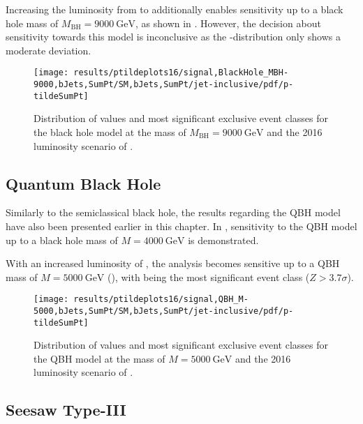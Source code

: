 Increasing the luminosity from \lumiA to \lumiB additionally enables sensitivity up to a black hole mass of $M_\text{BH} = \SI{9000}{\GeV}$, as shown in . However, the decision about sensitivity towards this model is inconclusive as the \ptilde-distribution only shows a moderate deviation. 
\begin{figure}
    \centering
    \texttt{[image: results/ptildeplots16/signal,BlackHole\_MBH-9000,bJets,SumPt/SM,bJets,SumPt/jet-inclusive/pdf/p-tildeSumPt]}
    {
        
    }
    \caption{Distribution of \ptilde values and most significant exclusive event classes for the black hole model at the mass of $M_\text{BH} = \SI{9000}{\GeV}$ and the 2016 luminosity scenario of \lumiB.}
    \label{fig:result_bh_9000}
\end{figure}

\subsection{Quantum Black Hole}
\label{sec:results_qbh}

Similarly to the semiclassical black hole, the results regarding the \ac{QBH} model have also been presented earlier in this chapter. In , sensitivity to the \ac{QBH} model up to a black hole mass of $M = \SI{4000}{\GeV}$ is demonstrated.

With an increased luminosity of \lumiB, the analysis becomes sensitive up to a \ac{QBH} mass of  $M = \SI{5000}{\GeV}$ (), with  being the most significant event class ($Z > \num{3.7}\sigma$).

\begin{figure}
    \centering
    \texttt{[image: results/ptildeplots16/signal,QBH\_M-5000,bJets,SumPt/SM,bJets,SumPt/jet-inclusive/pdf/p-tildeSumPt]}
    {
        
    }
    \caption{Distribution of \ptilde values and most significant exclusive event classes for the \acl{QBH} model at the mass of $M = \SI{5000}{\GeV}$ and the 2016 luminosity scenario of \lumiB.}
    \label{fig:result_qbh_5000}
\end{figure}


\subsection{Seesaw Type-III}
\label{sec:results_seesaw}

